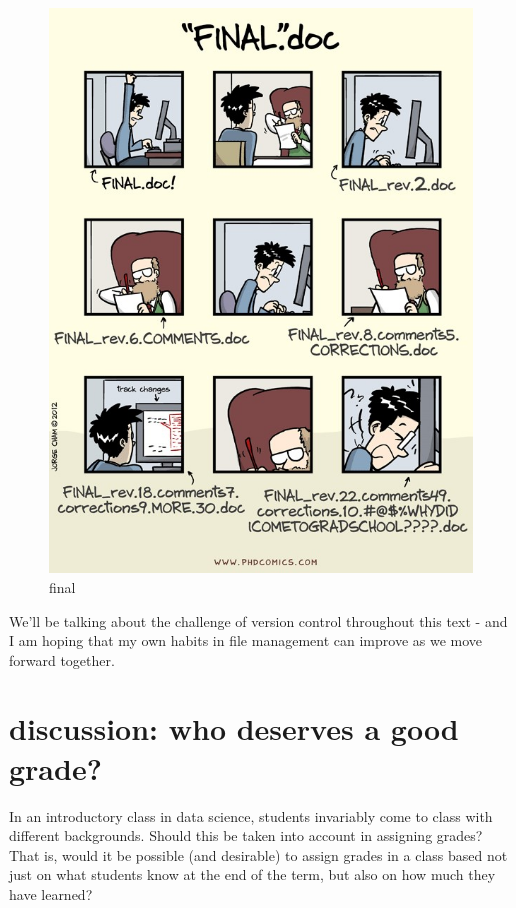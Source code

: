 \documentclass[openany]{book}
\begin{document}
\begin{figure}
\centering
\includegraphics{final.jpg}
\caption{final}
\end{figure}

We'll be talking about the challenge of version control throughout this text - and I am hoping that my own habits in file management can improve as we move forward together.

\hypertarget{discussion-who-deserves-a-good-grade}{%
\section{discussion: who deserves a good grade?}\label{discussion-who-deserves-a-good-grade}}

In an introductory class in data science, students invariably come to class with different backgrounds. Should this be taken into account in assigning grades? That is, would it be possible (and desirable) to assign grades in a class based not just on what students know at the end of the term, but also on how much they have learned?
\end{document}

